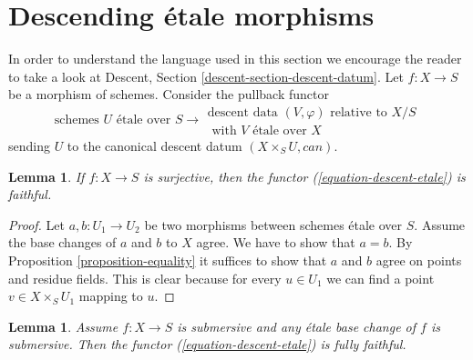 \documentclass{stacks-project}
\theoremstyle{plain}
\newtheorem{lemma}[subsection]{Lemma}
\theoremstyle{definition}
\theoremstyle{remark}
\numberwithin{equation}{subsection}
\begin{document}
\section{Descending \'etale morphisms}
\label{section-descending-etale}

\noindent
In order to understand the language used in this section we encourage
the reader to take a look at
Descent, Section \ref{descent-section-descent-datum}.
Let $f : X \to S$ be a morphism of schemes. Consider the
pullback functor
\begin{equation}
\label{equation-descent-etale}
\text{schemes }U\text{ \'etale over }S \longrightarrow
\begin{matrix}
\text{descent data }(V, \varphi)\text{ relative to }X/S \\
\text{ with }V\text{ \'etale over }X
\end{matrix}
\end{equation}
sending $U$ to the canonical descent datum $(X \times_S U, can)$.

\begin{lemma}
\label{lemma-faithful}
If $f : X \to S$ is surjective, then the functor
(\ref{equation-descent-etale}) is faithful.
\end{lemma}

\begin{proof}
Let $a, b : U_1 \to U_2$ be two morphisms between schemes \'etale over $S$.
Assume the base changes of $a$ and $b$ to $X$ agree.
We have to show that $a = b$.
By Proposition \ref{proposition-equality} it suffices to
show that $a$ and $b$ agree on points and residue fields.
This is clear because for every $u \in U_1$ we can find a point
$v \in X \times_S U_1$ mapping to $u$.
\end{proof}

\begin{lemma}
\label{lemma-fully-faithful}
Assume $f : X \to S$ is submersive and any \'etale base change
of $f$ is submersive. Then the functor
(\ref{equation-descent-etale}) is fully faithful.
\end{lemma}
\end{document}
